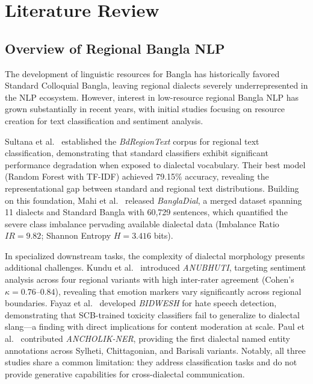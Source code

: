 \documentclass[12pt,a4paper]{article}
\begin{document}
\newpage


\section{Literature Review}

\subsection{Overview of Regional Bangla NLP}
The development of linguistic resources for Bangla has historically favored Standard Colloquial Bangla, leaving regional dialects severely underrepresented in the NLP ecosystem. However, interest in low-resource regional Bangla NLP has grown substantially in recent years, with initial studies focusing on resource creation for text classification and sentiment analysis.

Sultana et al.~\cite{sultana2024bdregion} established the \textit{BdRegionText} corpus for regional text classification, demonstrating that standard classifiers exhibit significant performance degradation when exposed to dialectal vocabulary. Their best model (Random Forest with TF-IDF) achieved 79.15\% accuracy, revealing the representational gap between standard and regional text distributions. Building on this foundation, Mahi et al.~\cite{mahi2025bangladial} released \textit{BanglaDial}, a merged dataset spanning 11 dialects and Standard Bangla with 60,729 sentences, which quantified the severe class imbalance pervading available dialectal data (Imbalance Ratio $IR = 9.82$; Shannon Entropy $H = 3.416$ bits).

In specialized downstream tasks, the complexity of dialectal morphology presents additional challenges. Kundu et al.~\cite{kundu2026anubhuti} introduced \textit{ANUBHUTI}, targeting sentiment analysis across four regional variants with high inter-rater agreement (Cohen's $\kappa = 0.76$--$0.84$), revealing that emotion markers vary significantly across regional boundaries. Fayaz et al.~\cite{fayaz2025bidwesh} developed \textit{BIDWESH} for hate speech detection, demonstrating that SCB-trained toxicity classifiers fail to generalize to dialectal slang---a finding with direct implications for content moderation at scale. Paul et al.~\cite{paul2025ancholik} contributed \textit{ANCHOLIK-NER}, providing the first dialectal named entity annotations across Sylheti, Chittagonian, and Barisali variants. Notably, all three studies share a common limitation: they address classification tasks and do not provide generative capabilities for cross-dialectal communication.
\end{document}
